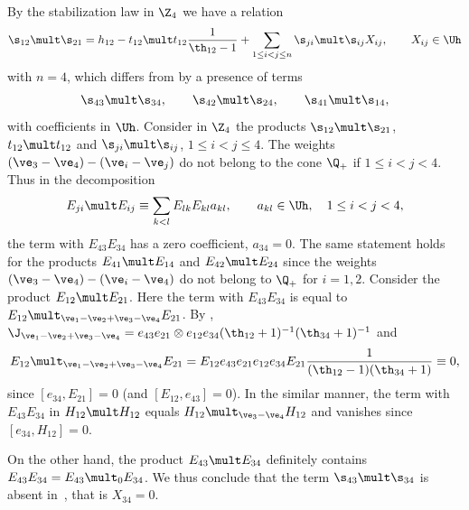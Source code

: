 By the stabilization law in $\Z_4$ we have a relation
\begin{gather} \label{proof23}
\s_{12}\mult \s_{21}= h_{12}-t_{12}\mult t_{12}  \frac{1}{\th_{12}-1}
+\sum_{1\leq i<j\leq n}\s_{ji}\mult\s_{ij}X_{ij} ,\qquad X_{ij}\in\Uh
\end{gather}
with $n=4$, which dif\/fers from  by a presence of terms
\begin{gather*}\s_{43}\mult\s_{34} ,\qquad \s_{42}\mult\s_{24} ,\qquad \s_{41}\mult\s_{14} ,
\end{gather*}
with coef\/f\/icients in $\Uh$. Consider in $\Z_4$ the products  $\s_{12}\mult\s_{21}$, $t_{12}\mult t_{12}$
and $\s_{ji}\mult\s_{ij}$, $1\leq i<j\leq 4$. The weights $(\ve_3-\ve_4)-(\ve_i-\ve_j)$ do not belong
to the cone $\Q_+$ if $1\leq i<j<4$. Thus in the decomposition
\begin{gather*}
E_{ji}\mult E_{ij}\equiv \sum_{k<l}E_{lk}E_{kl}a_{kl} ,\qquad a_{kl}\in\Uh ,\quad 1\leq i<j<4 ,
\end{gather*}
the term with $E_{43}E_{34}$ has a zero coef\/f\/icient, $a_{34}=0$. The same statement holds for the products
$E_{41}\mult E_{14}$ and $E_{42}\mult E_{24}$ since the weights $(\ve_3-\ve_4)-(\ve_i-\ve_4)$ do
not belong to $\Q_+$ for $i=1,2$. Consider the product $E_{12}\mult E_{21}$. Here the term with
$E_{43}E_{34}$ is equal to $E_{12}\mult_{\ve_1-\ve_2+\ve_3-\ve_4}E_{21}$. By ,
$\J_{\ve_1-\ve_2+\ve_3-\ve_4}=e_{43}e_{21}\otimes e_{12}e_{34}(\th_{12}+1)^{-1}(\th_{34}+1)^{-1}$ and
\begin{gather*}E_{12}\mult_{\ve_1-\ve_2+\ve_3-\ve_4}E_{21}=
E_{12}e_{43}e_{21}e_{12}e_{34}E_{21} \frac{1}{(\th_{12}-1)(\th_{34}+1)}\equiv 0,\end{gather*}
since $[e_{34},E_{21}]=0$ (and $[E_{12},e_{43}]=0$). In the similar manner, the term with
$E_{43}E_{34}$ in $H_{12}\mult H_{12}$ equals $H_{12}\mult_{\ve_3-\ve_4}H_{12}$ and vanishes
since $[e_{34},H_{12}]=0$.

On the other hand, the product $E_{43}\mult E_{34}$
def\/initely contains $E_{43}E_{34}=E_{43}\mult_0 E_{34}$. We thus conclude that the term
$\s_{43}\mult \s_{34}$ is absent in~, that is $X_{34}=0$.


